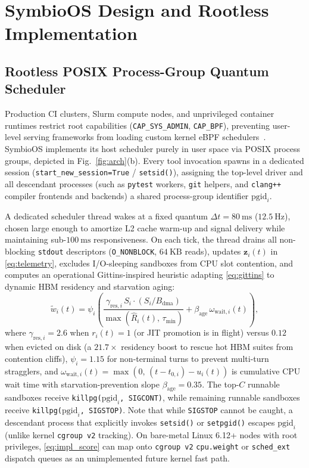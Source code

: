 \documentclass[10pt,journal,compsoc]{IEEEtran}
\theoremstyle{definition}
\theoremstyle{remark}
\newcommand{\SymbioOS}{\textup{\textsc{SymbioOS}}}
\def\SymbioOS{SymbioOS}%
\begin{document}
\section{SymbioOS Design and Rootless Implementation}\label{sec:design}

\subsection{Rootless POSIX Process-Group Quantum Scheduler}
Production CI clusters, Slurm compute nodes, and unprivileged container runtimes restrict root capabilities (\texttt{CAP\_SYS\_ADMIN}, \texttt{CAP\_BPF}), preventing user-level serving frameworks from loading custom kernel eBPF schedulers~\cite{zheng2026agentcgroup}. \SymbioOS{} implements its host scheduler purely in user space via POSIX process groups, depicted in Fig.~\ref{fig:arch}(b). Every tool invocation spawns in a dedicated session (\texttt{start\_new\_session=True} / \texttt{setsid()}), assigning the top-level driver and all descendant processes (such as \texttt{pytest} workers, \texttt{git} helpers, and \texttt{clang++} compiler frontends and backends) a shared process-group identifier $\mathrm{pgid}_i$.

A dedicated scheduler thread wakes at a fixed quantum $\Delta t = 80~\mathrm{ms}$ ($12.5~\mathrm{Hz}$), chosen large enough to amortize L2 cache warm-up and signal delivery while maintaining sub-$100~\mathrm{ms}$ responsiveness. On each tick, the thread drains all non-blocking \texttt{stdout} descriptors (\texttt{O\_NONBLOCK}, $64~\mathrm{KB}$ reads), updates $\mathbf{z}_i(t)$ in \eqref{eq:telemetry}, excludes I/O-sleeping sandboxes from CPU slot contention, and computes an operational Gittins-inspired heuristic adapting \eqref{eq:gittins} to dynamic HBM residency and starvation aging:
\begin{equation}\label{eq:impl_score}
\tilde{w}_i(t) = \psi_i \left(\frac{\gamma_{\mathrm{res},i}\, S_i \cdot (S_i / B_{\mathrm{dma}})}{\max(\hat{R}_i(t),\, \tau_{\min})} + \beta_{\mathrm{age}}\,\omega_{\mathrm{wait},i}(t)\right),
\end{equation}
where $\gamma_{\mathrm{res},i} = 2.6$ when $r_i(t) = 1$ (or JIT promotion is in flight) versus $0.12$ when evicted on disk (a $21.7\times$ residency boost to rescue hot HBM suites from contention cliffs), $\psi_i = 1.15$ for non-terminal turns to prevent multi-turn stragglers, and $\omega_{\mathrm{wait},i}(t) = \max(0,\, (t - t_{0,i}) - u_i(t))$ is cumulative CPU wait time with starvation-prevention slope $\beta_{\mathrm{age}} = 0.35$. The top-$C$ runnable sandboxes receive \texttt{killpg($\mathrm{pgid}_i$, SIGCONT)}, while remaining runnable sandboxes receive \texttt{killpg($\mathrm{pgid}_i$, SIGSTOP)}. Note that while \texttt{SIGSTOP} cannot be caught, a descendant process that explicitly invokes \texttt{setsid()} or \texttt{setpgid()} escapes $\mathrm{pgid}_i$ (unlike kernel \texttt{cgroup v2} tracking). On bare-metal Linux 6.12+ nodes with root privileges, \eqref{eq:impl_score} can map onto \texttt{cgroup v2} \texttt{cpu.weight} or \texttt{sched\_ext} dispatch queues as an unimplemented future kernel fast path.
\end{document}
